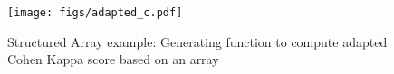 \begin{figure}
    \centering
    \texttt{[image: figs/adapted\_c.pdf]}
    \caption{Structured Array example: Generating function to compute adapted Cohen Kappa score based on an array}
    \label{fig:accepted_structured}
\end{figure}